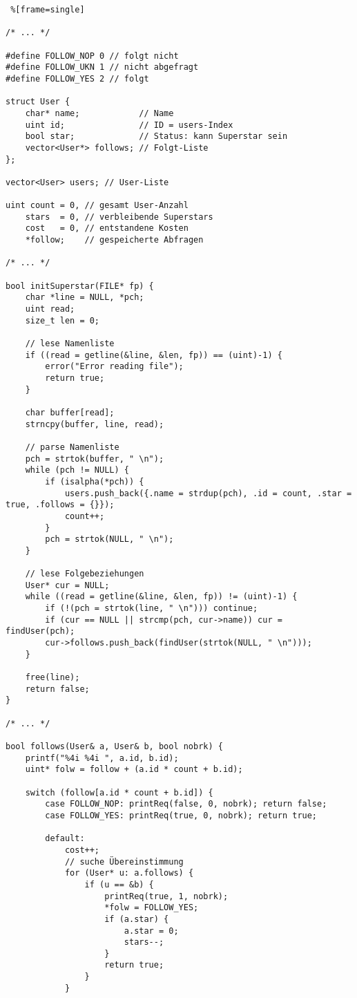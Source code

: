 \documentclass[a4paper,10pt,ngerman]{scrartcl}
\begin{document}
\begin{lstlisting} %[frame=single]

/* ... */

#define FOLLOW_NOP 0 // folgt nicht
#define FOLLOW_UKN 1 // nicht abgefragt
#define FOLLOW_YES 2 // folgt

struct User {
    char* name;            // Name
    uint id;               // ID = users-Index
    bool star;             // Status: kann Superstar sein
    vector<User*> follows; // Folgt-Liste
};

vector<User> users; // User-Liste

uint count = 0, // gesamt User-Anzahl
    stars  = 0, // verbleibende Superstars
    cost   = 0, // entstandene Kosten
    *follow;    // gespeicherte Abfragen

/* ... */

bool initSuperstar(FILE* fp) {
    char *line = NULL, *pch;
    uint read;
    size_t len = 0;

    // lese Namenliste
    if ((read = getline(&line, &len, fp)) == (uint)-1) {
        error("Error reading file");
        return true;
    }

    char buffer[read];
    strncpy(buffer, line, read);

    // parse Namenliste
    pch = strtok(buffer, " \n");
    while (pch != NULL) {
        if (isalpha(*pch)) {
            users.push_back({.name = strdup(pch), .id = count, .star = true, .follows = {}});
            count++;
        }
        pch = strtok(NULL, " \n");
    }

    // lese Folgebeziehungen
    User* cur = NULL;
    while ((read = getline(&line, &len, fp)) != (uint)-1) {
        if (!(pch = strtok(line, " \n"))) continue;
        if (cur == NULL || strcmp(pch, cur->name)) cur = findUser(pch);
        cur->follows.push_back(findUser(strtok(NULL, " \n")));
    }

    free(line);
    return false;
}

/* ... */

bool follows(User& a, User& b, bool nobrk) {
    printf("%4i %4i ", a.id, b.id);
    uint* folw = follow + (a.id * count + b.id);

    switch (follow[a.id * count + b.id]) {
        case FOLLOW_NOP: printReq(false, 0, nobrk); return false;
        case FOLLOW_YES: printReq(true, 0, nobrk); return true;

        default:
            cost++;
            // suche Übereinstimmung
            for (User* u: a.follows) {
                if (u == &b) {
                    printReq(true, 1, nobrk);
                    *folw = FOLLOW_YES;
                    if (a.star) {
                        a.star = 0;
                        stars--;
                    }
                    return true;
                }
            }


\end{lstlisting}
\end{document}
